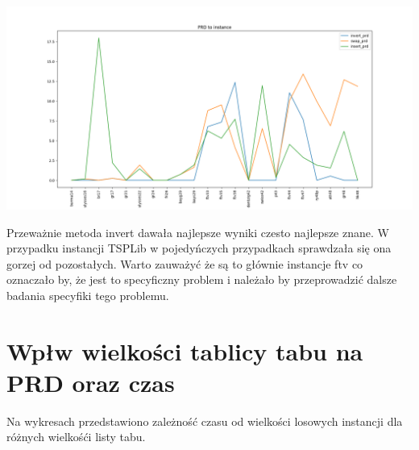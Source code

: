 \documentclass{article}
\begin{document}
\begin{adjustwidth}{-5cm}{-5cm}
  \begin{center}
    \includegraphics[scale=0.45]{prd.png}
  \end{center}
\end{adjustwidth}

Przeważnie metoda invert dawała najlepsze wyniki czesto najlepsze znane.
W przypadku instancji TSPLib w pojedyńczych przypadkach sprawdzała się ona gorzej
od pozostałych. Warto zauważyć że są to głównie instancje ftv co oznaczało by, że
jest to specyficzny problem i należało by przeprowadzić dalsze badania specyfiki tego
problemu.

\newpage
\section{Wpłw wielkości tablicy tabu na PRD oraz czas}
Na wykresach przedstawiono zależność czasu od wielkości losowych instancji dla różnych wielkośći listy tabu.
\end{document}
